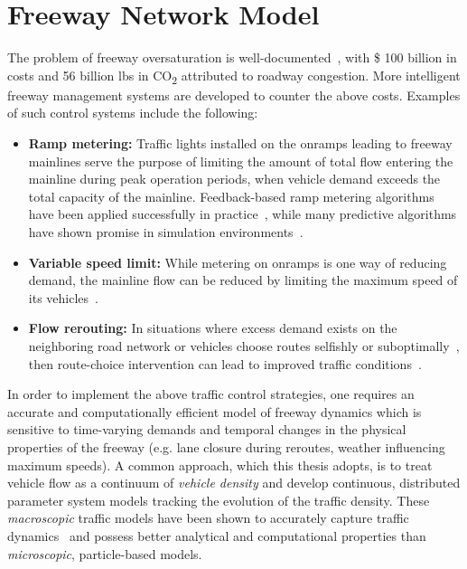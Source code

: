 \chapter{Freeway Network Model}
\label{chapter:freeway-network-model}

The problem of freeway oversaturation is well-documented~\cite{schrank2012tti}, with \$ 100 billion in costs and 56 billion lbs in CO\textsubscript{2} attributed to roadway congestion. More intelligent freeway management systems are developed to counter the above costs. Examples of such control systems include the following:

\begin{itemize}
  	\item \textbf{Ramp metering: } Traffic lights installed on the onramps leading to freeway mainlines serve the purpose of limiting the amount of total flow entering the mainline during peak operation periods, when vehicle demand exceeds the total capacity of the mainline. Feedback-based ramp metering algorithms have been applied successfully in practice~\cite{papageorgiou1997alinea,Papageorgiou1991,Papamichail}, while many predictive algorithms have shown promise in simulation environments~\cite{Reilly2013b,gomes2006optimal,Kotsialos2004}.
  	\item \textbf{Variable speed limit: } While metering on onramps is one way of reducing demand, the mainline flow can be reduced by limiting the maximum speed of its vehicles~\cite{Muralidharana}.
  	\item \textbf{Flow rerouting: } In situations where excess demand exists on the neighboring road network or vehicles choose routes selfishly or suboptimally~\cite{6744679,Jebbari,Krichene2012a,Roughgarden2003}, then route-choice intervention can lead to improved traffic conditions~\cite{Samaranayake2014,ziliaskopoulos2000linear}.
\end{itemize}

In order to implement the above traffic control strategies, one requires an accurate and computationally efficient model of freeway dynamics which is sensitive to time-varying demands and temporal changes in the physical properties of the freeway (e.g. lane closure during reroutes, weather influencing maximum speeds).
A common approach, which this thesis adopts, is to treat vehicle flow as a continuum of \emph{vehicle density} and develop continuous, distributed parameter system models tracking the evolution of the traffic density. These \emph{macroscopic} traffic models have been shown to accurately capture traffic dynamics~\cite{papageorgiou1989macroscopic} and possess better analytical and computational properties than \emph{microscopic}, particle-based models.

